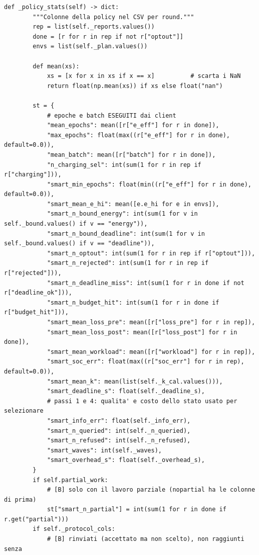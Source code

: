 \documentclass[11pt,a4paper]{article}
\begin{document}
\begin{lstlisting}[style=py,firstnumber=908,caption={\texttt{tesifl/strategies/sage\_smart.py}, lines 908--962}]
    def _policy_stats(self) -> dict:
        """Colonne della policy nel CSV per round."""
        rep = list(self._reports.values())
        done = [r for r in rep if not r["optout"]]
        envs = list(self._plan.values())

        def mean(xs):
            xs = [x for x in xs if x == x]          # scarta i NaN
            return float(np.mean(xs)) if xs else float("nan")

        st = {
            # epoche e batch ESEGUITI dai client
            "mean_epochs": mean([r["e_eff"] for r in done]),
            "max_epochs": float(max((r["e_eff"] for r in done), default=0.0)),
            "mean_batch": mean([r["batch"] for r in done]),
            "n_charging_sel": int(sum(1 for r in rep if r["charging"])),
            "smart_min_epochs": float(min((r["e_eff"] for r in done), default=0.0)),
            "smart_mean_e_hi": mean([e.e_hi for e in envs]),
            "smart_n_bound_energy": int(sum(1 for v in self._bound.values() if v == "energy")),
            "smart_n_bound_deadline": int(sum(1 for v in self._bound.values() if v == "deadline")),
            "smart_n_optout": int(sum(1 for r in rep if r["optout"])),
            "smart_n_rejected": int(sum(1 for r in rep if r["rejected"])),
            "smart_n_deadline_miss": int(sum(1 for r in done if not r["deadline_ok"])),
            "smart_n_budget_hit": int(sum(1 for r in done if r["budget_hit"])),
            "smart_mean_loss_pre": mean([r["loss_pre"] for r in rep]),
            "smart_mean_loss_post": mean([r["loss_post"] for r in done]),
            "smart_mean_workload": mean([r["workload"] for r in rep]),
            "smart_soc_err": float(max((r["soc_err"] for r in rep), default=0.0)),
            "smart_mean_k": mean(list(self._k_cal.values())),
            "smart_deadline_s": float(self._deadline_s),
            # passi 1 e 4: qualita' e costo dello stato usato per selezionare
            "smart_info_err": float(self._info_err),
            "smart_n_queried": int(self._n_queried),
            "smart_n_refused": int(self._n_refused),
            "smart_waves": int(self._waves),
            "smart_overhead_s": float(self._overhead_s),
        }
        if self.partial_work:
            # [B] solo con il lavoro parziale (nopartial ha le colonne di prima)
            st["smart_n_partial"] = int(sum(1 for r in done if r.get("partial")))
        if self._protocol_cols:
            # [B] rinviati (accettato ma non scelto), non raggiunti senza

\end{lstlisting}
\end{document}
